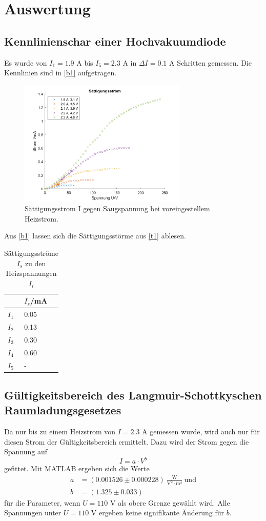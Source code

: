 \section{Auswertung}
\label{sec:Auswertung}
\subsection{Kennlinienschar einer Hochvakuumdiode}
 Es wurde von $I_{1}=1.9$ A bis $I_{5}=2.3$ A in $\Delta I=0.1$ A Schritten gemessen. Die Kennlinien sind in \autoref{b1} aufgetragen.
 \begin{figure}[H]
 \centering
 \includegraphics[width=8cm]{content/s.png}
 \caption{Sättigungsstrom I gegen Saugspannung bei voreingestellem Heizstrom.}
 \label{b1}
 \end{figure}
 Aus \autoref{b1} lassen sich die Sättigungsstörme aus \autoref{t1} ablesen. 
 \begin{table}[H]
  \centering
  \caption{Sättigungsströme $I_{s}$ zu den Heizspannungen $I_{i}$}
  \begin{tabular}{l|l}
  & $I_{s}$/mA\\\hline
  $I_{1}$ & 0.05\\
  $I_{2}$ & 0.13\\
  $I_{3}$ & 0.30\\
  $I_{4}$ & 0.60\\
  $I_{5}$ & -\\\hline
  \end{tabular}
  \label{t1}
 \end{table}

 \subsection{Gültigkeitsbereich des Langmuir-Schottkyschen Raumladungsgesetzes}
 Da nur bis zu einem Heizstrom von $I=2.3$ A gemessen wurde, wird auch nur für diesen Strom der Gültigkeitsbereich ermittelt. Dazu wird der Strom gegen die Spannung auf
 \begin{equation*}
   I=a\cdot V^{b}
 \end{equation*}
 gefittet. Mit MATLAB ergeben sich die Werte
 \begin{align*}
   a&=(0.001526 \pm 0.000228)\ \frac{\textrm{W}}{\textrm{V}^2 \cdot\textrm{m}^2}\ \textrm{und}\\
   b&=(1.325 \pm 0.033)
 \end{align*}
 für die Parameter, wenn $U=110$ V als obere Grenze gewählt wird. Alle Spannungen unter $U=110$ V ergeben keine signifikante Änderung für $b$.
 
